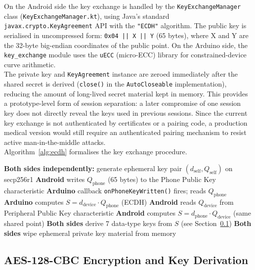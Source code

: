 \noindent On the Android side the key exchange is handled by the \texttt{KeyExchangeManager} class
(\texttt{KeyExchangeManager.kt}), using Java's standard \texttt{javax.crypto.KeyAgreement} API
with the \texttt{"ECDH"} algorithm.  The public key is serialised in uncompressed form:
\texttt{0x04 || X || Y} (65 bytes), where X and Y are the 32-byte big-endian coordinates of the
public point.  On the Arduino side, the \texttt{key\_exchange} module uses the \texttt{uECC}
(micro-ECC) library for constrained-device curve arithmetic. \\

\noindent The private key and \texttt{KeyAgreement} instance are zeroed immediately after the shared
secret is derived (\texttt{close()} in the \texttt{AutoCloseable} implementation), reducing the
amount of long-lived secret material kept in memory. This provides a prototype-level form of
session separation: a later compromise of one session key does not directly reveal the keys used in
previous sessions. Since the current key exchange is not authenticated by certificates or a pairing
code, a production medical version would still require an authenticated pairing mechanism to resist
active man-in-the-middle attacks. \\

\noindent Algorithm~\ref{alg:ecdh} formalises the key exchange procedure.

\begin{algorithm}[htbp]
\caption{Session Key Exchange (ECDH, secp256r1)}
\label{alg:ecdh}
\begin{algorithmic}[1]
  \STATE \textbf{Both sides independently:} generate ephemeral key pair
         $(d_\text{self}, Q_\text{self})$ on secp256r1
  \STATE \textbf{Android} writes $Q_\text{phone}$ (65 bytes) to the Phone Public Key characteristic
  \STATE \textbf{Arduino} callback \texttt{onPhoneKeyWritten()} fires; reads $Q_\text{phone}$
  \STATE \textbf{Arduino} computes $S = d_\text{device} \cdot Q_\text{phone}$ (ECDH)
  \STATE \textbf{Android} reads $Q_\text{device}$ from Peripheral Public Key characteristic
  \STATE \textbf{Android} computes $S = d_\text{phone} \cdot Q_\text{device}$ (same shared point)
  \STATE \textbf{Both sides} derive 7 data-type keys from $S$ (see Section~\ref{subsec:sec_kdf})
  \STATE \textbf{Both sides} wipe ephemeral private key material from memory
\end{algorithmic}
\end{algorithm}

\subsection{AES-128-CBC Encryption and Key Derivation}
\label{subsec:sec_kdf}

